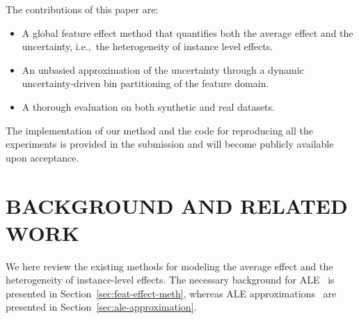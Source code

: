 \documentclass[twoside]{article}
\begin{document}
The contributions of this
paper are:
\begin{itemize}
\item A global feature effect method that quantifies both the average
  effect and the uncertainty, i.e.,~the heterogeneity of instance level
  effects.
\item An unbasied approximation of the uncertainty through a dynamic uncertainty-driven bin partitioning of the feature domain.
\item A thorough evaluation on both synthetic and real datasets.
\end{itemize}

The implementation of our method and the code for
reproducing all the experiments is provided in the submission and will
become publicly available upon acceptance.

\section{BACKGROUND AND RELATED WORK}

We here review the existing methods for modeling the average effect
and the heterogeneity of instance-level effects. The necessary
background for ALE~\citep{apley2020visualizing} is presented in
Section~\ref{sec:feat-effect-meth}, whereas ALE
approximations~\citep{apley2020visualizing, gkolemis22} are presented
in Section~\ref{sec:ale-approximation}.
\end{document}
